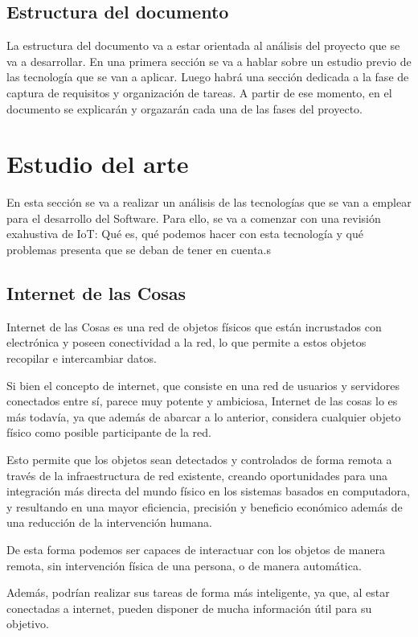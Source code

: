 \documentclass[12pt, a4paper, twoside]{article}
\begin{document}
\subsection{Estructura del documento}
La estructura del documento va a estar orientada al análisis del proyecto que se va a
desarrollar. En una primera sección se va a hablar sobre un estudio previo de las tecnología 
 que se van a aplicar. Luego habrá una sección dedicada a la fase de captura de requisitos y organización
de tareas. A partir de ese momento, en el documento se explicarán y orgazarán cada una 
de las fases del proyecto.

\section{Estudio del arte}
En esta sección se va a realizar un análisis de las tecnologías que se van a emplear para el 
desarrollo del Software. Para ello, se va a comenzar con una revisión exahustiva de IoT: 
Qué es, qué podemos hacer con esta tecnología y qué problemas presenta que se deban de tener en cuenta.s
\subsection{Internet de las Cosas}
Internet de las Cosas es una red de objetos físicos que están incrustados con electrónica y poseen 
conectividad a la red, lo que permite a estos objetos recopilar e intercambiar datos.

Si bien el concepto de internet, que consiste en una red de usuarios y servidores conectados entre sí,
parece muy potente y ambiciosa, Internet de las cosas lo es más todavía, ya que además de abarcar a 
lo anterior, considera cualquier objeto físico como posible participante de la red.

Esto permite que los objetos sean detectados y controlados de forma remota a través de la  infraestructura de red existente, 
creando oportunidades para una integración más directa del mundo físico en los sistemas basados 
en computadora, y resultando en una mayor eficiencia, precisión y beneficio económico además 
de una reducción de la intervención humana. 

De esta forma podemos ser capaces de interactuar con los objetos de manera remota, sin intervención física de
una persona, o de manera automática.

Además, podrían realizar sus tareas de forma más inteligente, ya que, al estar conectadas a internet, pueden
disponer de mucha información útil para su objetivo.
\end{document}
